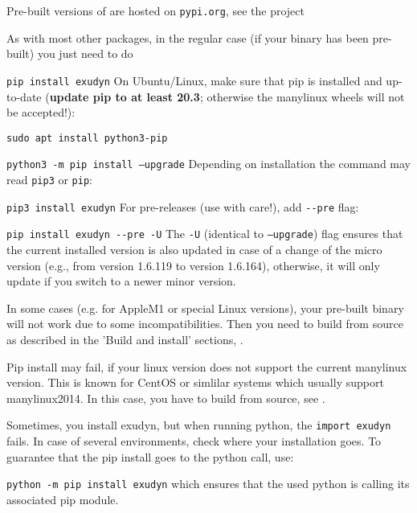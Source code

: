 Pre-built versions of \codeName are hosted on \texttt{pypi.org}, see the project
\bi
 \item {}
\ei
As with most other packages, in the regular case (if your binary has been pre-built) you just need to do
\bi
  \item[] \texttt{pip install exudyn}
\ei
On Ubuntu/Linux, make sure that pip is installed and up-to-date ({\bf update pip to at least 20.3}; otherwise the manylinux wheels will not be accepted!):
\bi 
  \item[] \texttt{sudo apt install python3-pip}
  \item[] \texttt{python3 -m pip install --upgrade}
\ei
Depending on installation the command may read \texttt{pip3} or \texttt{pip}: 
\bi
  \item[] \texttt{pip3 install exudyn}
\ei
For pre-releases (use with care!), add \texttt{-{}-pre} flag:
\bi
  \item[] \texttt{pip install exudyn -{}-pre -U}
\ei
The \texttt{-U} (identical to \texttt{--upgrade}) flag ensures that the current installed version is also updated in case of a change of the micro version (e.g., from version 1.6.119 to version 1.6.164), otherwise, it will only update if you switch to a newer minor version.

In some cases (e.g. for AppleM1 or special Linux versions), your pre-built binary will not work due to some incompatibilities. Then you need to build from source as described in the 'Build and install' sections, .

Pip install may fail, if your linux version does not support the current manylinux version.
This is known for CentOS or simlilar systems which usually support manylinux2014. In this case, you have to build \codeName from source, see .

Sometimes, you install exudyn, but when running python, the \texttt{import exudyn} fails.
In case of several environments, check where your installation goes. To guarantee that the pip install goes to the python call, use:
\bi 
  \item[] \texttt{python -m pip install exudyn} 
\ei
which ensures that the used python is calling its associated pip module.

